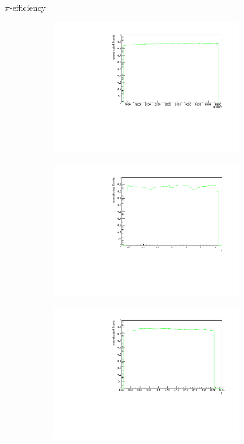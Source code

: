 \documentclass[11pt]{beamer}
\begin{document}
\begin{frame}{$\pi$-efficiency}
\begin{figure}
\begin{subfigure}{0.45\textwidth}
\includegraphics[width=0.9\textwidth]{up_pdf/single/tot/h_pt_reco_Pi.pdf}
\end{subfigure}
\begin{subfigure}{0.45\textwidth}
\includegraphics[width=0.9\textwidth]{up_pdf/single/tot/h_phi_reco_Pi.pdf}
\end{subfigure}
\begin{subfigure}{0.45\textwidth}
\includegraphics[width=0.9\textwidth]{up_pdf/single/tot/h_theta_reco_Pi.pdf}

\end{subfigure}
\end{figure}
\end{frame}
\end{document}
